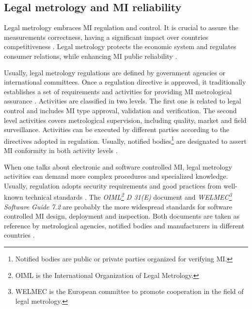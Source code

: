 \documentclass[journal]{IEEEtran}
\begin{document}
\subsection{Legal metrology and MI reliability}
\label{s:mi_realiability}
Legal metrology embraces MI regulation and control. It is crucial to assure the measurements correctness, having a significant impact over countries competitiveness \cite{RodriguesFilho2015}. Legal metrology protects the economic system and regulates consumer relations, while enhancing MI public reliability \cite{Oppermann2016}.

Usually, legal metrology regulations are defined by government agencies or international committees. Once a regulation directive is approved, it traditionally establishes a set of requirements and activities for providing MI metrological assurance \cite{RodriguesFilho2015}. Activities are classified in two levels. The first one is related to legal control and includes MI type approval, validation and verification. The second level activities covers metrological supervision, including quality, market and field surveillance. Activities can be executed by different parties according to the directives adopted in regulation. Usually, notified bodies\footnote{Notified bodies are public or private parties organized for verifying MI.} are designated to assert MI conformity in both activity levels \cite{Esche2015,Oppermann2016}. 

When one talks about electronic and software controlled MI, legal metrology activities can demand more complex procedures and specialized knowledge. Usually, regulation adopts security requirements and good practices from well-known technical standards \cite{Esche2015,Peters2015,Luchsinger2008}. The \emph{OIML\footnote{OIML is the International Organization of Legal Metrology.} D 31(E)} document \cite{InternationalOrganizationofLegalMetrologyOIML2008} and \emph{WELMEC\footnote{WELMEC is the European committee to promote cooperation in the field of legal metrology.} Software Guide 7.2} \cite{EuropeanCooperationinLegalMetrologyWELMEC2015} are probably the more widespread standards for software controlled MI design, deployment and inspection. Both documents are taken as reference by metrological agencies, notified bodies and manufacturers in different countries \cite{Camara2012,Peters2015}.
\end{document}
